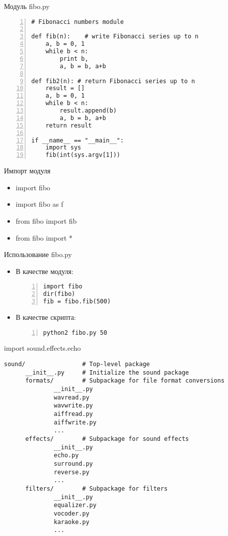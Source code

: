 \documentclass[hyperref={pdftex,unicode}]{beamer}
\begin{document}
\begin{frame}[fragile]{Модуль fibo.py}
  \begin{lstlisting}[basicstyle=\footnotesize\ttfamily,numbers=left]
# Fibonacci numbers module

def fib(n):    # write Fibonacci series up to n
    a, b = 0, 1
    while b < n:
        print b,
        a, b = b, a+b

def fib2(n): # return Fibonacci series up to n
    result = []
    a, b = 0, 1
    while b < n:
        result.append(b)
        a, b = b, a+b
    return result

if __name__ == "__main__":
    import sys
    fib(int(sys.argv[1]))
\end{lstlisting}
\end{frame}

\begin{frame}{Импорт модуля}
  \begin{itemize}
    \item import fibo
    \item import fibo as f
    \item from fibo import fib
    \item from fibo import *
  \end{itemize}
\end{frame}

\begin{frame}[fragile]{Использование fibo.py}
\begin{itemize}
\item В качестве модуля:
  \begin{lstlisting}[numbers=left]
import fibo
dir(fibo)
fib = fibo.fib(500)
  \end{lstlisting}
\item В качестве скрипта:
  \begin{lstlisting}[language=bash,numbers=left]
python2 fibo.py 50
  \end{lstlisting}
\end{itemize}
\end{frame}

\begin{frame}[fragile]{import sound.effects.echo}
  \begin{lstlisting}[basicstyle=\scriptsize\ttfamily]
sound/                # Top-level package
      __init__.py     # Initialize the sound package
      formats/        # Subpackage for file format conversions
              __init__.py 
              wavread.py  
              wavwrite.py 
              aiffread.py 
              aiffwrite.py
              ...         
      effects/        # Subpackage for sound effects
              __init__.py 
              echo.py     
              surround.py 
              reverse.py  
              ...         
      filters/        # Subpackage for filters
              __init__.py
              equalizer.py
              vocoder.py
              karaoke.py
              ...
  \end{lstlisting}
\end{frame}
\end{document}
